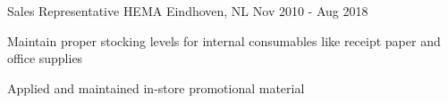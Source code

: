 \begin{cventries}
  \cventry
    {Sales Representative} %
    {HEMA} %
    {Eindhoven, NL} %
    {Nov 2010 - Aug 2018} %
    {
      \begin{cvitems} %
        \item {Maintain proper stocking levels for internal consumables like receipt paper and office supplies}
        \item {Applied and maintained in-store promotional material}
      \end{cvitems}
    }

\end{cventries}
